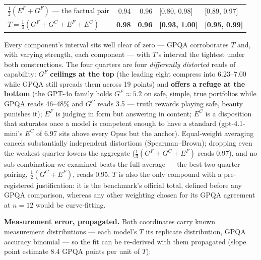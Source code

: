 \documentclass{article}
\begin{document}
\begin{table}[H]
\begin{center}
{\begin{tabular}{@{}lrrll@{}}
\(\tfrac12(E^{F}+G^{F})\) --- the factual pair &\cellcolor[HTML]{162875}\textcolor[HTML]{FFFFFF}{0.94}&\cellcolor[HTML]{11246B}\textcolor[HTML]{FFFFFF}{0.96}& {[}0.80, 0.98{]} & {[}0.89, 0.97{]}  \\
\(T = \tfrac14(G^{F}+G^{C}+E^{F}+E^{C})\) &\cellcolor[HTML]{0D2162}\textcolor[HTML]{FFFFFF}{\textbf{0.98}}&\cellcolor[HTML]{11246B}\textcolor[HTML]{FFFFFF}{\textbf{0.96}}& \textbf{{[}0.93, 1.00{]}} & \textbf{{[}0.95, 0.99{]}}  \\
\bottomrule
\end{tabular}}
\end{center}
\end{table}

Every component's interval sits well clear of zero --- GPQA corroborates \(T\) and, with varying strength, each component --- with \(T\)'s interval the tightest under both constructions. The four quarters are four \emph{differently distorted} reads of capability: \(G^{F}\) \textbf{ceilings at the top} (the leading eight compress into 6.23--7.00 while GPQA still spreads them across 19 points) and \textbf{offers a refuge at the bottom} (the GPT-4o family holds \(G^{F}\approx5.2\) on safe, simple, true portfolios while GPQA reads 46--48\% and \(G^{C}\) reads 3.5 --- truth rewards playing safe, beauty punishes it); \(E^{F}\) is judging in form but answering in content; \(E^{C}\) is a disposition that saturates once a model is competent enough to have a standard (gpt-4.1-mini's \(E^{C}\) of 6.97 sits above every Opus but the anchor). Equal-weight averaging cancels substantially independent distortions (Spearman--Brown); dropping even the weakest quarter lowers the aggregate (\(\tfrac13(G^{F}+G^{C}+E^{F})\) reads 0.97), and no sub-combination we examined beats the full average --- the best two-quarter pairing, \(\tfrac12(G^{C}+E^{F})\), reads 0.95. \(T\) is also the only compound with a pre-registered justification: it is the benchmark's official total, defined before any GPQA comparison, whereas any other weighting chosen for its GPQA agreement at \(n = 12\) would be curve-fitting.

\textbf{Measurement error, propagated.} Both coordinates carry known measurement distributions --- each model's \(T\) its replicate distribution, GPQA accuracy binomial --- so the fit can be re-derived with them propagated (slope point estimate 8.4 GPQA points per unit of \(T\)):
\end{document}
